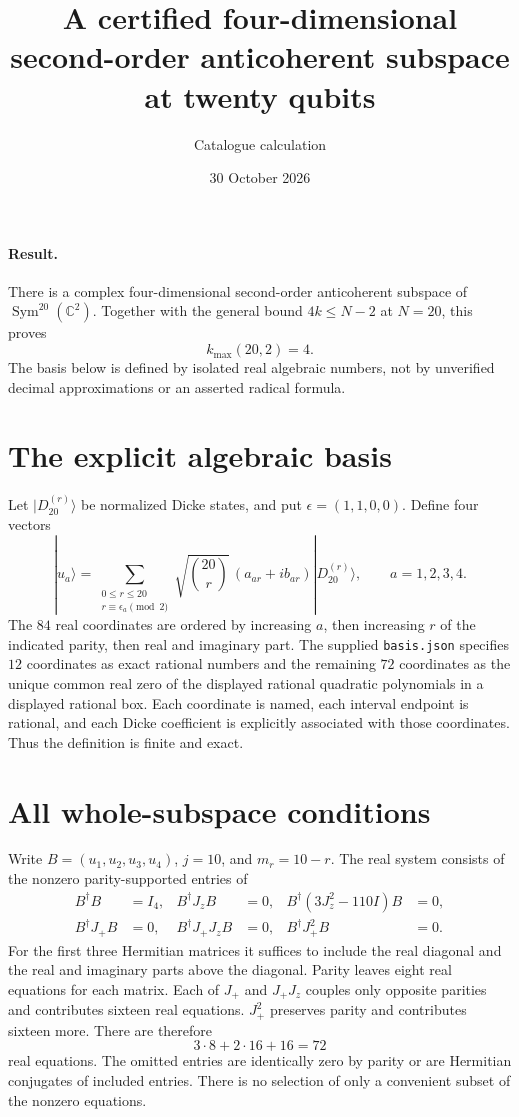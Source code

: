 \documentclass[11pt]{article}
\begin{document}
\title{A certified four-dimensional second-order anticoherent subspace at twenty qubits}
\author{Catalogue calculation}
\date{30 October 2026}
\maketitle

\paragraph{Result.}
There is a complex four-dimensional second-order anticoherent subspace
of $\operatorname{Sym}^{20}(\mathbb C^2)$.  Together with the general
bound $4k\le N-2$ at $N=20$, this proves
\[
\boxed{k_{\max}(20,2)=4.}
\]
The basis below is defined by isolated real algebraic numbers, not by
unverified decimal approximations or an asserted radical formula.

\section{The explicit algebraic basis}
Let $|D_{20}^{(r)}\rangle$ be normalized Dicke states, and put
$\epsilon=(1,1,0,0)$.  Define four vectors
\[
|u_a\rangle=\sum_{\substack{0\le r\le20\\r\equiv\epsilon_a\pmod2}}
\sqrt{\binom{20}{r}}\,(a_{ar}+i b_{ar})|D_{20}^{(r)}\rangle,
\qquad a=1,2,3,4.
\]
The $84$ real coordinates are ordered by increasing $a$, then increasing
$r$ of the indicated parity, then real and imaginary part.  The supplied
\texttt{basis.json} specifies $12$ coordinates as exact rational numbers
and the remaining $72$ coordinates as the unique common real zero of
the displayed rational quadratic polynomials in a displayed rational
box.  Each coordinate is named, each interval endpoint is rational, and
each Dicke coefficient is explicitly associated with those coordinates.
Thus the definition is finite and exact.

\section{All whole-subspace conditions}
Write $B=(u_1,u_2,u_3,u_4)$, $j=10$, and $m_r=10-r$.  The real system
consists of the nonzero parity-supported entries of
\begin{align*}
B^\dagger B&=I_4,&
B^\dagger J_zB&=0,&
B^\dagger(3J_z^2-110I)B&=0,\\
B^\dagger J_+B&=0,&
B^\dagger J_+J_zB&=0,&
B^\dagger J_+^2B&=0.
\end{align*}
For the first three Hermitian matrices it suffices to include the real
diagonal and the real and imaginary parts above the diagonal.  Parity
leaves eight real equations for each matrix.  Each of $J_+$ and
$J_+J_z$ couples only opposite parities and contributes sixteen real
equations.  $J_+^2$ preserves parity and contributes sixteen more.
There are therefore
\[
3\cdot8+2\cdot16+16=72
\]
real equations.  The omitted entries are identically zero by parity or
are Hermitian conjugates of included entries.  There is no selection of
only a convenient subset of the nonzero equations.
\end{document}

